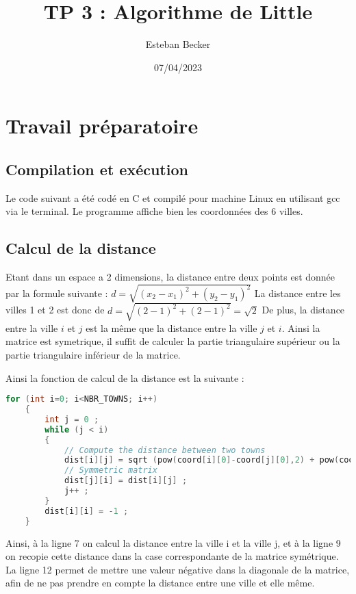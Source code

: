 \documentclass[11pt]{article}
\author{Esteban Becker}
\date{07/04/2023}
\title{TP 3 :  Algorithme de Little}
\begin{document}
\maketitle

\tableofcontents
\newpage

\section{Travail préparatoire}

\subsection{Compilation et exécution}

Le code suivant a été codé en C et compilé pour machine Linux en utilisant gcc via le terminal. 
Le programme affiche bien les coordonnées des 6 villes.

\subsection{Calcul de la distance}

Etant dans un espace a 2 dimensions, la distance entre deux points est donnée par la formule suivante : $d = \sqrt{(x_2 - x_1)^2 + (y_2 - y_1)^2}$
La distance entre les villes 1 et 2 est donc de $d = \sqrt{(2 - 1)^2 + (2 - 1)^2} = \sqrt{2}$
De plus, la distance entre la ville $i$ et $j$ est la même que la distance entre la ville $j$ et $i$. Ainsi la matrice est symetrique, il suffit de calculer la partie triangulaire supérieur ou la partie triangulaire inférieur de la matrice.

Ainsi la fonction de calcul de la distance est la suivante :
\begin{lstlisting}[language=C]
for (int i=0; i<NBR_TOWNS; i++)
    {
        int j = 0 ;
        while (j < i)
        {
            // Compute the distance between two towns
            dist[i][j] = sqrt (pow(coord[i][0]-coord[j][0],2) + pow(coord[i][1]-coord[j][1],2)) ;
            // Symmetric matrix
            dist[j][i] = dist[i][j] ;
            j++ ;
        }
        dist[i][i] = -1 ; 
    }
\end{lstlisting}

Ainsi, à la ligne 7 on calcul la distance entre la ville i et la ville j, et à la ligne 9 on recopie cette distance dans la case correspondante de la matrice symétrique.
La ligne 12 permet de mettre une valeur négative dans la diagonale de la matrice, afin de ne pas prendre en compte la distance entre une ville et elle même.
\end{document}
